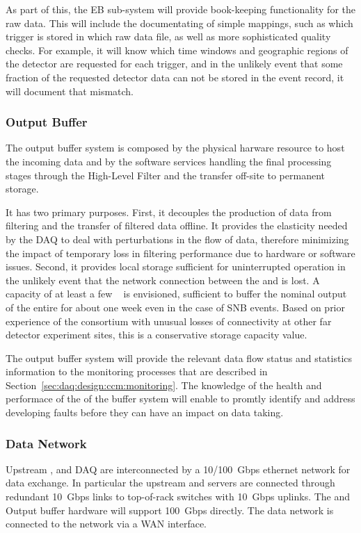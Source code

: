 As part of this, the EB sub-system will provide book-keeping functionality for the raw data.  This will include the documentating of simple mappings, such as which trigger is stored in which raw data file, as well as more sophisticated quality checks. For example, it will know which time windows and geographic regions of the detector are requested for each trigger, and in the unlikely event that some fraction of the requested detector data can not be stored in the event record, it will document that mismatch.

\subsubsection{Output Buffer}

The output buffer system is composed by the physical harware resource to host the incoming data and by the software services handling the final processing stages through the High-Level Filter and the transfer off-site to permanent storage.

It has two primary purposes.  First, it decouples the production of data from filtering and the
transfer of filtered data offline. It provides the elasticity needed by the DAQ to deal with
perturbations in the flow of data, therefore minimizing the impact of temporary loss in filtering
performance due to hardware or software issues. Second, it provides local storage sufficient for
uninterrupted  operation in the unlikely event that the network connection between the
 and \fnal is lost.  A capacity of at least a few \si{\peta\byte} is envisioned,
sufficient to buffer the nominal output of the entire  for about one week even in the case of SNB events. Based on prior experience of the consortium with unusual losses of  connectivity at
other far detector experiment sites, this is a conservative storage capacity value.

The output buffer system will provide the relevant data flow status and statistics information to the monitoring processes that are described in Section~\ref{sec:daq:design:ccm:monitoring}. The knowledge of the health and performace of the of the buffer system will enable to promtly identify and address developing faults before they can have an impact on data taking.


\subsubsection{Data Network}
Upstream ,  and  DAQ are interconnected by a \SI{10/100}{ Gbps} ethernet network for data exchange.
In particular the upstream  and  servers are connected through redundant \SI{10}{ Gbps} links to top-of-rack switches with \SI{10}{Gbps} uplinks.
The  and Output buffer hardware will support \SI{100}{Gbps} directly.
The  data network is connected to the \fnal network via a WAN interface.

